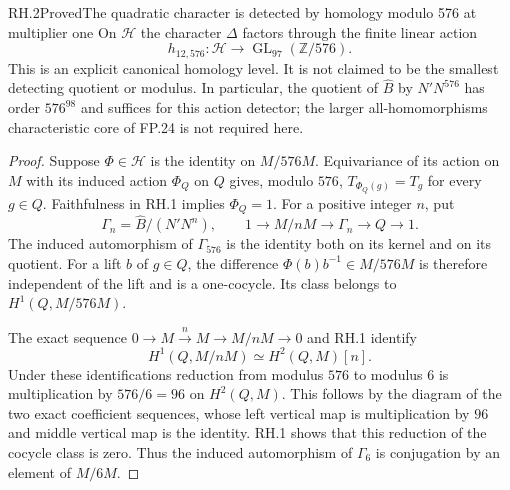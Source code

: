 \begin{statement}{RH.2}{Proved}{The quadratic character is detected by homology modulo 576 at multiplier one}
On $\mathcal H$ the character $\Delta$ factors through the
finite linear action
\[
 h_{12,576}:\mathcal H\longrightarrow
        \operatorname{GL}_{97}(\mathbb Z/576).
 \tag{RH.2.1}
\]
This is an explicit canonical homology level. It is not claimed
to be the smallest detecting quotient or modulus.  In
particular, the quotient of $\widehat B$ by $N'N^{576}$ has
order $576^{98}$ and suffices for this action detector; the
larger all-homomorphisms characteristic core of FP.24 is not
required here.
\end{statement}
\begin{proof}
Suppose $\Phi\in\mathcal H$ is the identity on $M/576M$.
Equivariance of its action on $M$ with its induced action
$\Phi_Q$ on $Q$ gives, modulo $576$,
$T_{\Phi_Q(g)}=T_g$ for every $g\in Q$.
Faithfulness in RH.1 implies $\Phi_Q=1$.
For a positive integer $n$, put
\[
 \Gamma_n=\widehat B/(N'N^n),\qquad
 1\longrightarrow M/nM\longrightarrow\Gamma_n
       \longrightarrow Q\longrightarrow1.
\]
The induced automorphism of $\Gamma_{576}$ is the identity
both on its kernel and on its quotient. For a lift $b$ of
$g\in Q$, the difference $\Phi(b)b^{-1}\in M/576M$
is therefore independent of the lift and is a one-cocycle.
Its class belongs to $H^1(Q,M/576M)$.

The exact sequence $0\to M\xrightarrow{n}M\to M/nM\to0$
and RH.1 identify
\[
 H^1(Q,M/nM)\simeq H^2(Q,M)[n].
\]
Under these identifications reduction from modulus $576$ to
modulus $6$ is multiplication by $576/6=96$ on $H^2(Q,M)$.
This follows by the diagram of the two exact coefficient
sequences, whose left vertical map is multiplication by $96$
and middle vertical map is the identity.  RH.1 shows that this
reduction of the cocycle class is zero. Thus the induced
automorphism of $\Gamma_6$ is conjugation by an element of
$M/6M$.


\end{proof}
